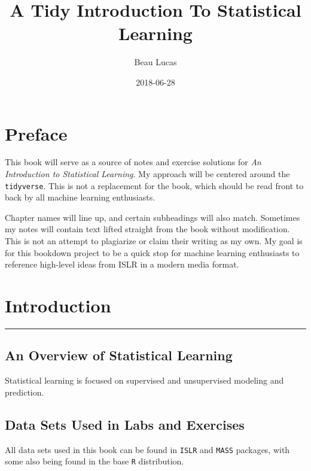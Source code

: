 \documentclass[]{book}
\title{A Tidy Introduction To Statistical Learning}
\author{Beau Lucas}
\date{2018-06-28}
\theoremstyle{definition}
\theoremstyle{definition}
\theoremstyle{definition}
\theoremstyle{remark}
\begin{document}
\maketitle

{
\setcounter{tocdepth}{1}
\tableofcontents
}
\chapter*{Preface}\label{preface}

This book will serve as a source of notes and exercise solutions for
\emph{An Introduction to Statistical Learning}. My approach will be
centered around the \texttt{tidyverse}. This is not a replacement for
the book, which should be read front to back by all machine learning
enthusiasts.

Chapter names will line up, and certain subheadings will also match.
Sometimes my notes will contain text lifted straight from the book
without modification. This is not an attempt to plagiarize or claim
their writing as my own. My goal is for this bookdown project to be a
quick stop for machine learning enthusiasts to reference high-level
ideas from ISLR in a modern media format.

\chapter{Introduction}\label{intro}

\begin{center}\rule{0.5\linewidth}{\linethickness}\end{center}

\section{An Overview of Statistical
Learning}\label{an-overview-of-statistical-learning}

Statistical learning is focused on supervised and unsupervised modeling
and prediction.

\section{Data Sets Used in Labs and
Exercises}\label{data-sets-used-in-labs-and-exercises}

All data sets used in this book can be found in \texttt{ISLR} and
\texttt{MASS} packages, with some also being found in the base
\texttt{R} distribution.
\end{document}
